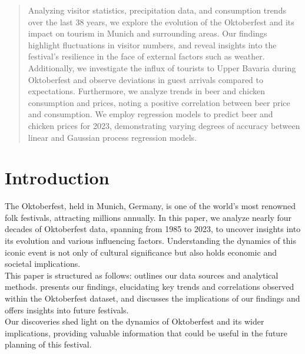\documentclass{article}
\theoremstyle{plain}
\theoremstyle{definition}
\theoremstyle{remark}
\begin{document}
\printAffiliationsAndNotice{\icmlEqualContribution} %

\begin{abstract}
Analyzing visitor statistics, precipitation data, and consumption trends over the last 38 years, we explore the evolution of the Oktoberfest and its impact on tourism in Munich and surrounding areas. Our findings highlight fluctuations in visitor numbers, and reveal insights into the festival's resilience in the face of external factors such as weather. Additionally, we investigate the influx of tourists to Upper Bavaria during Oktoberfest and observe deviations in guest arrivals compared to expectations. Furthermore, we analyze trends in beer and chicken consumption and prices, noting a positive correlation between beer price and consumption. We employ regression models to predict beer and chicken prices for 2023, demonstrating varying degrees of accuracy between linear and Gaussian process regression models.
\end{abstract}

\section{Introduction}\label{sec:intro}
The Oktoberfest, held in Munich, Germany, is one of the world's most renowned folk festivals, attracting millions annually. In this paper, we analyze nearly four decades of Oktoberfest data, spanning from 1985 to 2023, to uncover insights into its evolution and various influencing factors. Understanding the dynamics of this iconic event is not only of cultural significance but also holds economic and societal implications. \\
 This paper is structured as follows:  outlines our data sources and analytical methods.  presents our findings, elucidating key trends and correlations observed within the Oktoberfest dataset, and  discusses the implications of our findings and offers insights into future festivals.\\
Our discoveries shed light on the dynamics of Oktoberfest and its wider implications, providing valuable information that could be useful in the future planning of this festival.
\end{document}
